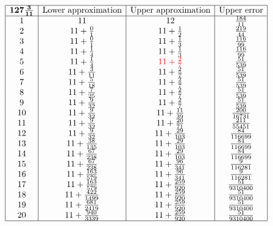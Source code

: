\documentclass{amsart}
\begin{document}
$$\begin{array}{|c|c|c|c|}
 \hline
 {\bf 127\frac{3}{11}}&\text{Lower approximation}&\text{Upper approximation}&\text{Upper error}\\
 \hline
 1&11&12&\frac{184}{11}\\
2&11+\frac{0}{1}&11+\frac{1}{2}&\frac{219}{44}\\
3&11+\frac{0}{1}&11+\frac{1}{3}&\frac{116}{99}\\
4&11+\frac{1}{4}&11+\frac{1}{3}&\frac{116}{99}\\
5&11+\frac{1}{4}&{\color{red}11+\frac{2}{7}}&\frac{51}{539}\\
6&11+\frac{3}{11}&11+\frac{2}{7}&\frac{51}{539}\\
7&11+\frac{5}{18}&11+\frac{2}{7}&\frac{51}{539}\\
8&11+\frac{7}{25}&11+\frac{2}{7}&\frac{51}{539}\\
9&11+\frac{9}{32}&11+\frac{2}{7}&\frac{51}{539}\\
10&11+\frac{9}{32}&11+\frac{11}{39}&\frac{200}{16731}\\
11&11+\frac{9}{32}&11+\frac{20}{71}&\frac{211}{55451}\\
12&11+\frac{9}{32}&11+\frac{29}{103}&\frac{84}{116699}\\
13&11+\frac{38}{135}&11+\frac{29}{103}&\frac{84}{116699}\\
14&11+\frac{67}{238}&11+\frac{29}{103}&\frac{84}{116699}\\
15&11+\frac{67}{238}&11+\frac{96}{341}&\frac{9}{116281}\\
16&11+\frac{163}{579}&11+\frac{96}{341}&\frac{9}{116281}\\
17&11+\frac{163}{579}&11+\frac{259}{920}&\frac{51}{9310400}\\
18&11+\frac{422}{1499}&11+\frac{259}{920}&\frac{51}{9310400}\\
19&11+\frac{681}{2419}&11+\frac{259}{920}&\frac{51}{9310400}\\
20&11+\frac{940}{3339}&11+\frac{259}{920}&\frac{51}{9310400}\\
\hline
\end{array}$$
\newpage
\end{document}
